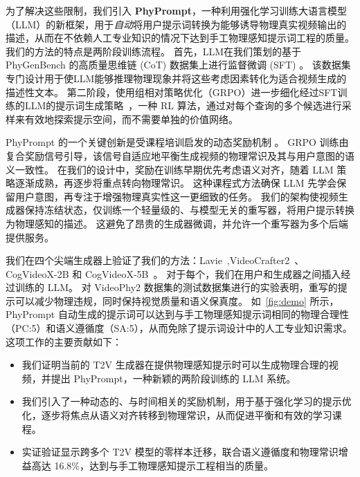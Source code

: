 为了解决这些限制，我们引入 \textbf{PhyPrompt}，一种利用强化学习训练大语言模型（LLM）的新框架，用于\emph{自动}将用户提示词转换为能够诱导物理真实视频输出的描述，从而在不依赖人工专业知识的情况下达到手工物理感知提示词工程的质量。
我们的方法的特点是两阶段训练流程。
首先，LLM在我们策划的基于 PhyGenBench 的高质量思维链 (CoT) 数据集上进行监督微调 (SFT) \cite{meng2024towards}。
该数据集专门设计用于使LLM能够推理物理现象并将这些考虑因素转化为适合视频生成的描述性文本。
第二阶段，使用组相对策略优化（GRPO）进一步细化经过SFT训练的LLM的提示词生成策略~\cite{guo2025deepseek}，一种 RL 算法，通过对每个查询的多个候选进行采样来有效地探索提示空间，而不需要单独的价值网络。

PhyPrompt 的一个关键创新是受课程培训启发的动态奖励机制 \cite{bengio2009curriculum}。
GRPO 训练由复合奖励信号引导，该信号自适应地平衡生成视频的物理常识及其与用户意图的语义一致性。
在我们的设计中，奖励在训练早期优先考虑语义对齐，随着 LLM 策略逐渐成熟，再逐步将重点转向物理常识。
这种课程式方法确保 LLM 先学会保留用户意图，再专注于增强物理真实性这一更细致的任务。
我们的架构使视频生成器保持冻结状态，仅训练一个轻量级的、与模型无关的重写器，将用户提示转换为物理感知的描述。
这避免了昂贵的生成器微调，并允许一个重写器为多个后端提供服务。

我们在四个尖端生成器上验证了我们的方法：Lavie~\cite{wang2023lavie},VideoCrafter2~\cite{chen2024videocrafter2}、CogVideoX-2B 和 CogVideoX-5B~\cite{wang2024cogvideodex}。
对于每个，我们在用户和生成器之间插入经过训练的 LLM。
对 VideoPhy2 数据集的测试数据集进行的实验表明，重写的提示可以减少物理违规，同时保持视觉质量和语义保真度。
如~\cref{fig:demo} 所示，PhyPrompt 自动生成的提示词可以达到与手工物理感知提示词相同的物理合理性（PC:5）和语义遵循度（SA:5），从而免除了提示词设计中的人工专业知识需求。
这项工作的主要贡献如下：
\begin{itemize}
    \item 我们证明当前的 T2V 生成器在提供物理感知提示时可以生成物理合理的视频，并提出 PhyPrompt，一种新颖的两阶段训练的 LLM 系统。
    \item 我们引入了一种动态的、与时间相关的奖励机制，用于基于强化学习的提示优化，逐步将焦点从语义对齐转移到物理常识，从而促进平衡和有效的学习课程。
      \item 实证验证显示跨多个 T2V 模型的零样本迁移，联合语义遵循度和物理常识增益高达 16.8\%，达到与手工物理感知提示工程相当的质量。
\end{itemize}
